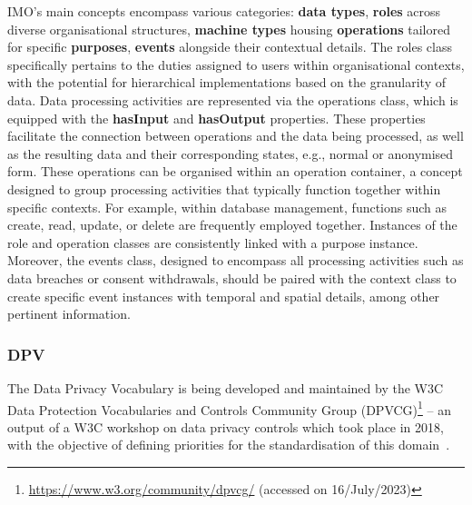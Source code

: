 IMO's main concepts encompass various categories: \textbf{data types}, \textbf{roles} across diverse organisational structures, \textbf{machine types} housing \textbf{operations} tailored for specific \textbf{purposes}, \textbf{events} alongside their contextual details.
The roles class specifically pertains to the duties assigned to users within organisational contexts, with the potential for hierarchical implementations based on the granularity of data.
Data processing activities are represented via the operations class, which is equipped with the \textbf{hasInput} and \textbf{hasOutput} properties.
These properties facilitate the connection between operations and the data being processed, as well as the resulting data and their corresponding states, e.g., normal or anonymised form.
These operations can be organised within an operation container, a concept designed to group processing activities that typically function together within specific contexts.
For example, within database management, functions such as create, read, update, or delete are frequently employed together.
Instances of the role and operation classes are consistently linked with a purpose instance.
Moreover, the events class, designed to encompass all processing activities such as data breaches or consent withdrawals, should be paired with the context class to create specific event instances with temporal and spatial details, among other pertinent information.

\subsubsection{DPV}
\label{sec:dpv}

The Data Privacy Vocabulary is being developed and maintained by the W3C Data Protection Vocabularies and Controls Community Group (DPVCG)\footnote{\url{https://www.w3.org/community/dpvcg/} (accessed on 16/July/2023)} -- an output of a W3C workshop on data privacy controls which took place in 2018, with the objective of defining priorities for the standardisation of this domain~\citep{bonatti_data_2018}.

